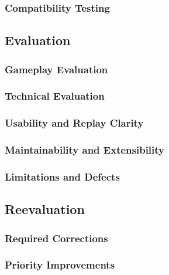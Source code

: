 \subsubsection{Compatibility Testing}

\subsection{Evaluation}
\subsubsection{Gameplay Evaluation}
\subsubsection{Technical Evaluation}
\subsubsection{Usability and Replay Clarity}
\subsubsection{Maintainability and Extensibility}
\subsubsection{Limitations and Defects}

\subsection{Reevaluation}
\subsubsection{Required Corrections}
\subsubsection{Priority Improvements}

